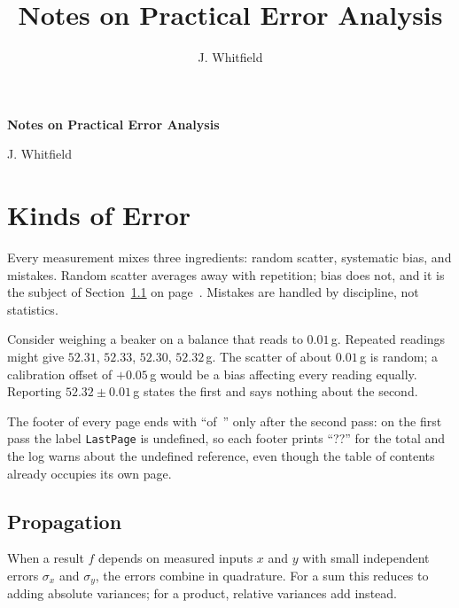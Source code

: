 \documentclass[11pt,oneside]{book}
\title{Notes on Practical Error Analysis}
\author{J. Whitfield}
\date{}
\begin{document}
\begin{center}
  {\Large\bfseries Notes on Practical Error Analysis\par}
  \vspace{0.5em}
  {J. Whitfield\par}
\end{center}
\tableofcontents

\chapter{Kinds of Error}
\label{ch:kinds}

Every measurement mixes three ingredients: random scatter, systematic bias,
and mistakes. Random scatter averages away with repetition; bias does not,
and it is the subject of Section~\ref{sec:propagate} on
page~\pageref{sec:propagate}. Mistakes are handled by discipline, not
statistics.

Consider weighing a beaker on a balance that reads to $0.01$\,g. Repeated
readings might give $52.31$, $52.33$, $52.30$, $52.32$\,g. The scatter of
about $0.01$\,g is random; a calibration offset of $+0.05$\,g would be a
bias affecting every reading equally. Reporting $52.32 \pm 0.01$\,g states
the first and says nothing about the second.

The footer of every page ends with ``of~\pageref{LastPage}'' only after
the second pass: on the first pass the label \texttt{LastPage} is undefined,
so each footer prints ``??'' for the total and the log warns about the
undefined reference, even though the table of contents already occupies its
own page.

\section{Propagation}
\label{sec:propagate}

When a result $f$ depends on measured inputs $x$ and $y$ with small
independent errors $\sigma_x$ and $\sigma_y$, the errors combine in
quadrature. For a sum this reduces to adding absolute variances; for a
product, relative variances add instead.
\end{document}
